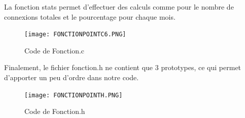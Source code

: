 La fonction stats permet d'effectuer des calculs comme pour le nombre de connexions totales et le pourcentage pour chaque mois.

\begin{figure}[htp!]
  \centering
  \setlength\figureheight{7cm}
  \setlength\figurewidth{9cm}
  \texttt{[image: FONCTIONPOINTC6.PNG]}
  \caption{Code de Fonction.c}
  \label{fig:courbe-tikz}
\end{figure}

\newpage

Finalement, le fichier fonction.h ne contient que 3 prototypes, ce qui permet d'apporter un peu d'ordre dans notre code. 

\begin{figure}[htp!]
  \centering
  \setlength\figureheight{7cm}
  \setlength\figurewidth{9cm}
  \texttt{[image: FONCTIONPOINTH.PNG]}
  \caption{Code de Fonction.h}
  \label{fig:courbe-tikz}
\end{figure}